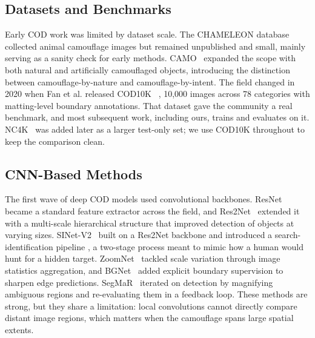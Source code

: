 \documentclass[10pt,conference]{IEEEtran}
\begin{document}
\subsection{Datasets and Benchmarks}
Early COD work was limited by dataset scale. The CHAMELEON database~\cite{skurowski2018chameleon} collected animal camouflage images but remained unpublished and small, mainly serving as a sanity check for early methods. CAMO~\cite{le2019anabranch} expanded the scope with both natural and artificially camouflaged objects, introducing the distinction between camouflage-by-nature and camouflage-by-intent. The field changed in 2020 when Fan et al. released COD10K~\cite{fan2020cod} , 10,000 images across 78 categories with matting-level boundary annotations. That dataset gave the community a real benchmark, and most subsequent work, including ours, trains and evaluates on it. NC4K~\cite{lv2021nc4k} was added later as a larger test-only set; we use COD10K throughout to keep the comparison clean.

\subsection{CNN-Based Methods}
The first wave of deep COD models used convolutional backbones. ResNet~\cite{he2016resnet} became a standard feature extractor across the field, and Res2Net~\cite{gao2021res2net} extended it with a multi-scale hierarchical structure that improved detection of objects at varying sizes. SINet-V2~\cite{fan2022sinetv2} built on a Res2Net backbone and introduced a search-identification pipeline , a two-stage process meant to mimic how a human would hunt for a hidden target. ZoomNet~\cite{pang2022zoomnet} tackled scale variation through image statistics aggregation, and BGNet~\cite{sun2022bgnet} added explicit boundary supervision to sharpen edge predictions. SegMaR~\cite{gao2022segmar} iterated on detection by magnifying ambiguous regions and re-evaluating them in a feedback loop. These methods are strong, but they share a limitation: local convolutions cannot directly compare distant image regions, which matters when the camouflage spans large spatial extents.
\end{document}

